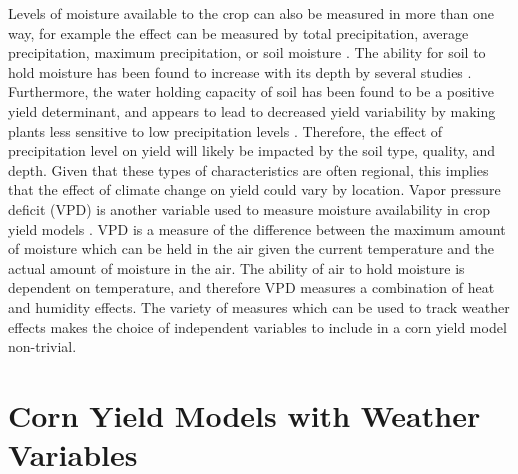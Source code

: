 Levels of moisture available to the crop can also be measured in more than one way, for example the effect can be measured by total precipitation, average precipitation, maximum precipitation, or soil moisture \citep{dixon1994estimating}. The ability for soil to hold moisture has been found to increase with its depth by several studies \citep{lee2015topsoil, Guilpart}. Furthermore, the water holding capacity of soil has been found to be a positive yield determinant, and appears to lead to decreased yield variability by making plants less sensitive to low precipitation levels \cite{williams2016soil, lee2015topsoil}. Therefore, the effect of precipitation level on yield will likely be impacted by the soil type, quality, and depth. Given that these types of characteristics are often regional, this implies that the effect of climate change on yield could vary by location.   Vapor pressure deficit (VPD) is another variable used to measure moisture availability in crop yield models \citep{lobell2014greater,tolhurst2015cold}. VPD is a measure of the difference between the maximum amount of moisture which can be held in the air given the current temperature and the actual amount of moisture in the air. The ability of air to hold moisture is dependent on temperature, and therefore VPD measures a combination of heat and humidity effects. The variety of measures which can be used to track weather effects makes the choice of independent variables to include in a corn yield model non-trivial.

\section{Corn Yield Models with Weather Variables}

